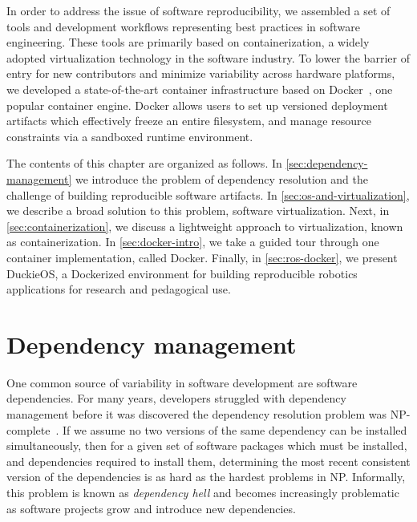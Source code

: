 \documentclass[12pt,initial,twoside,maitrise]{dms}
\numberwithin{equation}{section}
\numberwithin{table}{chapter}
\numberwithin{figure}{chapter}
\begin{document}
In order to address the issue of software reproducibility, we assembled a set of tools and development workflows representing best practices in software engineering. These tools are primarily based on containerization, a widely adopted virtualization technology in the software industry. To lower the barrier of entry for new contributors and minimize variability across hardware platforms, we developed a state-of-the-art container infrastructure based on Docker~\citep{merkel2014docker}, one popular container engine. Docker allows users to set up versioned deployment artifacts which effectively freeze an entire filesystem, and manage resource constraints via a sandboxed runtime environment.

The contents of this chapter are organized as follows. In \autoref{sec:dependency-management} we introduce the problem of dependency resolution and the challenge of building reproducible software artifacts. In \autoref{sec:os-and-virtualization}, we describe a broad solution to this problem, software virtualization. Next, in \autoref{sec:containerization}, we discuss a lightweight approach to virtualization, known as containerization. In \autoref{sec:docker-intro}, we take a guided tour through one container implementation, called Docker. Finally, in \autoref{sec:ros-docker}, we present DuckieOS, a Dockerized environment for building reproducible robotics applications for research and pedagogical use.

\section{Dependency management}\label{sec:dependency-management}

One common source of variability in software development are software dependencies. For many years, developers struggled with dependency management before it was discovered the dependency resolution problem was NP-complete~\citep{abate2012dependency}. If we assume no two versions of the same dependency can be installed simultaneously, then for a given set of software packages which must be installed, and dependencies required to install them, determining the most recent consistent version of the dependencies is as hard as the hardest problems in NP. Informally, this problem is known as \textit{dependency hell} and becomes increasingly problematic as software projects grow and introduce new dependencies.
\end{document}
